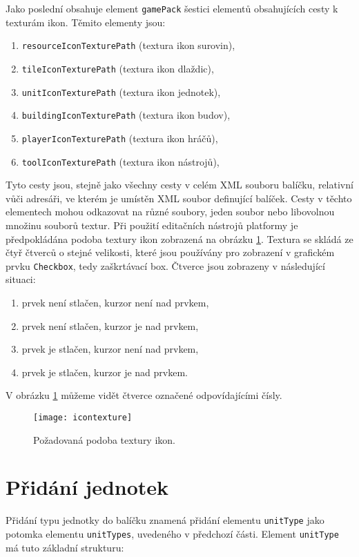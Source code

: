 Jako poslední obsahuje element \texttt{gamePack} šestici elementů obsahujících cesty k texturám ikon. Těmito elementy jsou:
\begin{enumerate}
	\item \texttt{resourceIconTexturePath} (textura ikon surovin),
	\item \texttt{tileIconTexturePath} (textura ikon dlaždic),
	\item \texttt{unitIconTexturePath} (textura ikon jednotek),
	\item \texttt{buildingIconTexturePath} (textura ikon budov),
	\item \texttt{playerIconTexturePath} (textura ikon hráčů),
	\item \texttt{toolIconTexturePath} (textura ikon nástrojů),
\end{enumerate}
Tyto cesty jsou, stejně jako všechny cesty v celém XML souboru balíčku, relativní vůči adresáři, ve kterém je umístěn XML soubor definující balíček. Cesty v těchto elementech mohou odkazovat na různé soubory, jeden soubor nebo libovolnou množinu souborů textur. Při použití editačních nástrojů platformy je předpokládána podoba textury ikon zobrazená na obrázku \ref{fig:icontexture}. Textura se skládá ze čtyř čtverců o stejné velikosti, které jsou používány pro zobrazení v grafickém prvku \texttt{Checkbox}, tedy zaškrtávací box. Čtverce jsou zobrazeny v následující situaci:
\begin{enumerate}
	\item prvek není stlačen, kurzor není nad prvkem,
	\item prvek není stlačen, kurzor je nad prvkem,
	\item prvek je stlačen, kurzor není nad prvkem,
	\item prvek je stlačen, kurzor je nad prvkem.
\end{enumerate}

V obrázku \ref{fig:icontexture} můžeme vidět čtverce označené odpovídajícími čísly.

\begin{figure}[h]
	\centering
	\texttt{[image: icontexture]}
	\caption{Požadovaná podoba textury ikon.}
	\label{fig:icontexture}
\end{figure}

\section{Přidání jednotek}
\label{sec:addunit}
Přidání typu jednotky do balíčku znamená přidání elementu \texttt{unitType} jako potomka elementu \texttt{unitTypes}, uvedeného v předchozí části. Element \texttt{unitType} má tuto základní strukturu:


